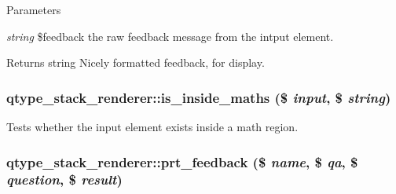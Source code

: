 \begin{DoxyParams}{Parameters}
\item[{\em string}]\$feedback the raw feedback message from the intput element. \end{DoxyParams}
\begin{DoxyReturn}{Returns}
string Nicely formatted feedback, for display. 
\end{DoxyReturn}
\hypertarget{classqtype__stack__renderer_a208556850d5c0d037268a9c35d7480ac}{
\subsubsection[{is\_\-inside\_\-maths}]{\setlength{\rightskip}{0pt plus 5cm}qtype\_\-stack\_\-renderer::is\_\-inside\_\-maths (\$ {\em input}, \/  \$ {\em string})}}
\label{classqtype__stack__renderer_a208556850d5c0d037268a9c35d7480ac}
Tests whether the input element exists inside a math region. \hypertarget{classqtype__stack__renderer_a7dd45346f726c3dc68c98c8b3d58dc14}{
\subsubsection[{prt\_\-feedback}]{\setlength{\rightskip}{0pt plus 5cm}qtype\_\-stack\_\-renderer::prt\_\-feedback (\$ {\em name}, \/  \$ {\em qa}, \/  \$ {\em question}, \/  \$ {\em result})}}
\label{classqtype__stack__renderer_a7dd45346f726c3dc68c98c8b3d58dc14}

